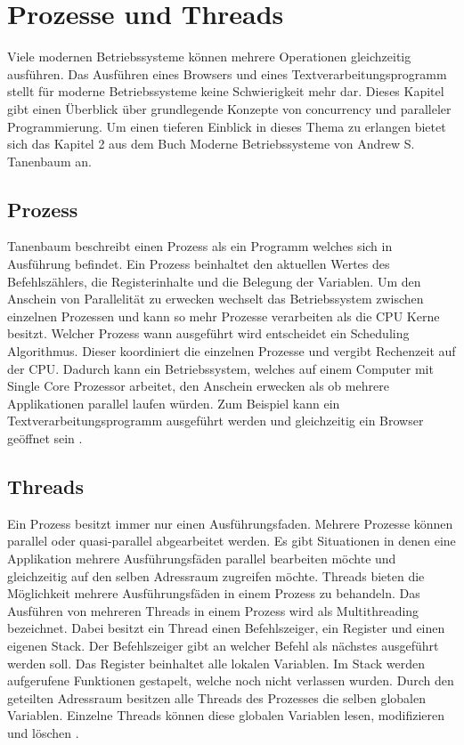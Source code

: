 \section{Prozesse und Threads}

Viele modernen Betriebssysteme können mehrere Operationen gleichzeitig ausführen. Das Ausführen eines Browsers und eines Textverarbeitungsprogramm stellt für moderne Betriebssysteme keine Schwierigkeit mehr dar. Dieses Kapitel gibt einen Überblick über grundlegende Konzepte von concurrency und paralleler Programmierung. Um einen tieferen Einblick in dieses Thema zu erlangen bietet sich das Kapitel 2 aus dem Buch Moderne Betriebssysteme von Andrew S. Tanenbaum an. 

\subsection{Prozess}
\label{section: Prozess}
Tanenbaum beschreibt einen Prozess als ein Programm welches sich in Ausführung befindet. Ein Prozess beinhaltet den aktuellen Wertes des Befehlszählers, die Registerinhalte und die Belegung der Variablen. Um den Anschein von Parallelität zu erwecken wechselt das Betriebssystem zwischen einzelnen Prozessen und kann so mehr Prozesse verarbeiten als die CPU Kerne besitzt. Welcher Prozess wann ausgeführt wird entscheidet ein Scheduling Algorithmus. Dieser koordiniert die einzelnen Prozesse und vergibt Rechenzeit auf der CPU. Dadurch kann ein Betriebssystem, welches auf einem Computer mit Single Core Prozessor arbeitet, den Anschein erwecken als ob mehrere Applikationen parallel laufen würden. Zum Beispiel kann ein Textverarbeitungsprogramm ausgeführt werden und gleichzeitig ein Browser geöffnet sein \cite[p. 87]{tan09}.

\subsection{Threads}
\label{section: Threads}
Ein Prozess besitzt immer nur einen Ausführungsfaden. Mehrere Prozesse können parallel oder quasi-parallel abgearbeitet werden. Es gibt Situationen in denen eine Applikation mehrere Ausführungsfäden parallel bearbeiten möchte und gleichzeitig auf den selben Adressraum zugreifen möchte. Threads bieten die Möglichkeit mehrere Ausführungsfäden in einem Prozess zu behandeln. Das Ausführen von mehreren Threads in einem Prozess wird als Multithreading bezeichnet. Dabei besitzt ein Thread einen Befehlszeiger, ein Register und einen eigenen Stack. Der Befehlszeiger gibt an welcher Befehl als nächstes ausgeführt werden soll. Das Register beinhaltet alle lokalen Variablen. Im Stack werden aufgerufene Funktionen gestapelt, welche noch nicht verlassen wurden. Durch den geteilten Adressraum besitzen alle Threads des Prozesses die selben globalen Variablen. Einzelne Threads können diese globalen Variablen lesen, modifizieren und löschen \cite[p. 97]{tan09}. 

